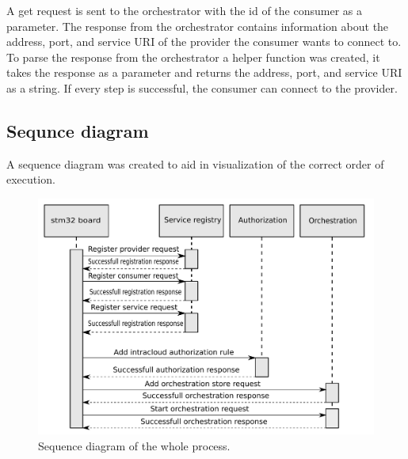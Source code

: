 A get request is sent to the orchestrator with the id of the consumer as a parameter.
The response from the orchestrator contains information about the address, port, and service URI of the provider the consumer wants to connect to.
To parse the response from the orchestrator a helper function was created, it takes the response as a parameter and returns the address, port, and service URI as a string.
If every step is successful, the consumer can connect to the provider.

\subsection{Sequnce diagram}
A sequence diagram was created to aid in visualization of the correct order of execution.
\begin{figure}[H]
    \centering
    \includegraphics[width=\textwidth]{Pictures/sequence_diagram_total.pdf} 
    \caption{Sequence diagram of the whole process.}
    \label{sequence diagram}
\end{figure}